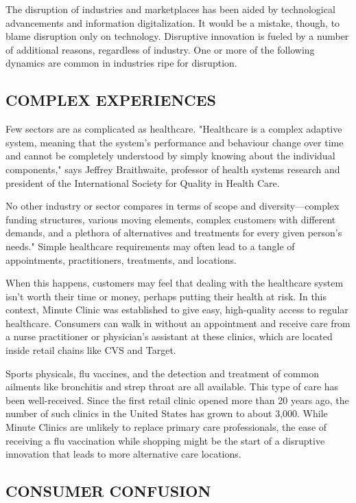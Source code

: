 \documentclass{article}
\begin{document}
The disruption of industries and marketplaces has been aided by technological advancements and information digitalization. It would be a mistake, though, to blame disruption only on technology. Disruptive innovation is fueled by a number of additional reasons, regardless of industry. One or more of the following dynamics are common in industries ripe for disruption.

\subsection{COMPLEX EXPERIENCES}

Few sectors are as complicated as healthcare. "Healthcare is a complex adaptive system, meaning that the system's performance and behaviour change over time and cannot be completely understood by simply knowing about the individual components," says Jeffrey Braithwaite, professor of health systems research and president of the International Society for Quality in Health Care.


No other industry or sector compares in terms of scope and diversity—complex funding structures, various moving elements, complex customers with different demands, and a plethora of alternatives and treatments for every given person's needs." Simple healthcare requirements may often lead to a tangle of appointments, practitioners, treatments, and locations.


When this happens, customers may feel that dealing with the healthcare system isn't worth their time or money, perhaps putting their health at risk. In this context, Minute Clinic was established to give easy, high-quality access to regular healthcare. Consumers can walk in without an appointment and receive care from a nurse practitioner or physician's assistant at these clinics, which are located inside retail chains like CVS and Target.


Sports physicals, flu vaccines, and the detection and treatment of common ailments like bronchitis and strep throat are all available. This type of care has been well-received.
Since the first retail clinic opened more than 20 years ago, the number of such clinics in the United States has grown to about 3,000. While Minute Clinics are unlikely to replace primary care professionals, the ease of receiving a flu vaccination while shopping might be the start of a disruptive innovation that leads to more alternative care locations.

\subsection{CONSUMER CONFUSION}
\end{document}
